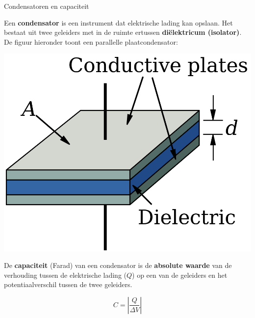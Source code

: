 \begin{theo}{Condensatoren en capaciteit}
    
    Een \textbf{condensator} is een instrument dat elektrische lading kan opslaan. Het bestaat uit twee geleiders met in de ruimte ertussen \textbf{diëlektricum (isolator)}.  De figuur hieronder toont een parallelle plaatcondensator:
    
    \begin{center}
        \includegraphics[scale = 0.125]{Images/Elektriciteit/Condensator.png}
    \end{center}
    
    \noindent De \textbf{capaciteit} (Farad) van een condensator is de \textbf{absolute waarde} van de verhouding tussen de elektrische lading ($ Q $) op een van de geleiders en het potentiaalverschil tussen de twee geleiders.
    
    \begin{equation*}
        C = |\dfrac{Q}{\Delta V}|
    \end{equation*}
\end{theo}

